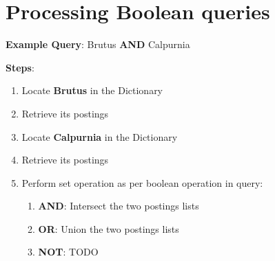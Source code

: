 \section{Processing Boolean queries \cite{ir-1}}\label{Processing Boolean queries}

\textbf{Example Query}: Brutus \textbf{AND} Calpurnia

\vspace{0.2cm}
\textbf{Steps}:
\begin{enumerate}
    \item Locate \textbf{Brutus} in the Dictionary

    \item Retrieve its postings

    \item Locate \textbf{Calpurnia} in the Dictionary

    \item Retrieve its postings

    \item Perform set operation as per boolean operation in query:
    \begin{enumerate}
        \item \textbf{AND}: Intersect the two postings lists
        \item \textbf{OR}: Union the two postings lists
        \item \textbf{NOT}: TODO
    \end{enumerate}

    
\end{enumerate}

